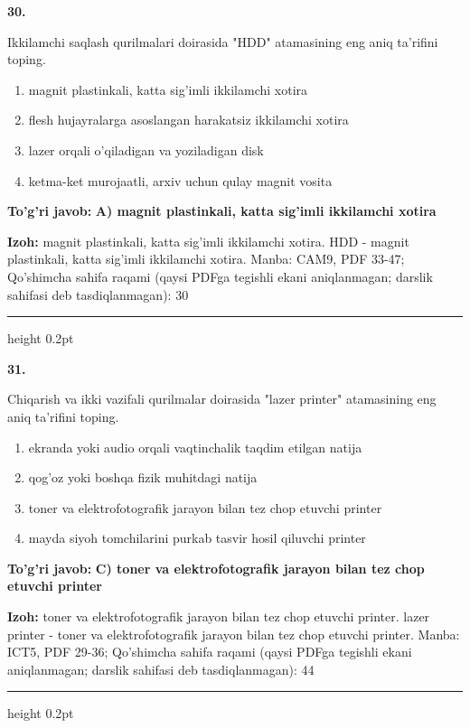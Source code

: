 \documentclass[10pt,a4paper]{article}
\begin{document}
{\bfseries\sffamily\color{ink} 30.}
\par
Ikkilamchi saqlash qurilmalari doirasida "HDD" atamasining eng aniq ta'rifini toping.
\begin{enumerate}[label=\Alph*),leftmargin=9mm]
\item magnit plastinkali, katta sig'imli ikkilamchi xotira
\item flesh hujayralarga asoslangan harakatsiz ikkilamchi xotira
\item lazer orqali o'qiladigan va yoziladigan disk
\item ketma-ket murojaatli, arxiv uchun qulay magnit vosita
\end{enumerate}
\begin{tcolorbox}[enhanced,breakable,colback=teal!4,colframe=teal!60!black,boxrule=0.45pt,arc=1.2mm,left=2.7mm,right=2.7mm,top=1.8mm,bottom=1.8mm,before skip=2mm,after skip=2mm]
{\bfseries\sffamily\color{teal}To'g'ri javob:} \textbf{A) magnit plastinkali, katta sig'imli ikkilamchi xotira}
\par\smallskip
{\bfseries Izoh:} magnit plastinkali, katta sig'imli ikkilamchi xotira. HDD - magnit plastinkali, katta sig'imli ikkilamchi xotira. Manba: CAM9, PDF 33-47; Qo'shimcha sahifa raqami (qaysi PDFga tegishli ekani aniqlanmagan; darslik sahifasi deb tasdiqlanmagan): 30
\end{tcolorbox}
\vspace{2mm}\hrule height 0.2pt\vspace{3mm}

{\bfseries\sffamily\color{ink} 31.}
\par
Chiqarish va ikki vazifali qurilmalar doirasida "lazer printer" atamasining eng aniq ta'rifini toping.
\begin{enumerate}[label=\Alph*),leftmargin=9mm]
\item ekranda yoki audio orqali vaqtinchalik taqdim etilgan natija
\item qog'oz yoki boshqa fizik muhitdagi natija
\item toner va elektrofotografik jarayon bilan tez chop etuvchi printer
\item mayda siyoh tomchilarini purkab tasvir hosil qiluvchi printer
\end{enumerate}
\begin{tcolorbox}[enhanced,breakable,colback=teal!4,colframe=teal!60!black,boxrule=0.45pt,arc=1.2mm,left=2.7mm,right=2.7mm,top=1.8mm,bottom=1.8mm,before skip=2mm,after skip=2mm]
{\bfseries\sffamily\color{teal}To'g'ri javob:} \textbf{C) toner va elektrofotografik jarayon bilan tez chop etuvchi printer}
\par\smallskip
{\bfseries Izoh:} toner va elektrofotografik jarayon bilan tez chop etuvchi printer. lazer printer - toner va elektrofotografik jarayon bilan tez chop etuvchi printer. Manba: ICT5, PDF 29-36; Qo'shimcha sahifa raqami (qaysi PDFga tegishli ekani aniqlanmagan; darslik sahifasi deb tasdiqlanmagan): 44
\end{tcolorbox}
\vspace{2mm}\hrule height 0.2pt\vspace{3mm}
\end{document}
